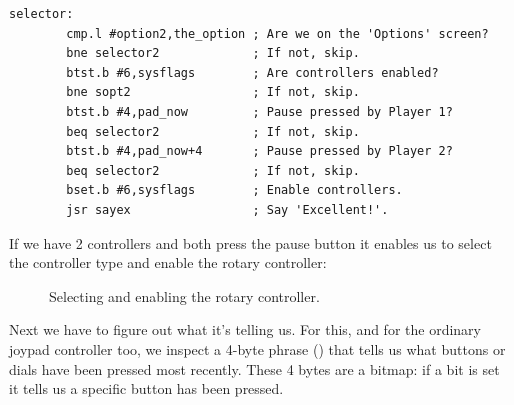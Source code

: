 \begin{lstlisting}
selector:
        cmp.l #option2,the_option ; Are we on the 'Options' screen?
        bne selector2             ; If not, skip.
        btst.b #6,sysflags        ; Are controllers enabled?
        bne sopt2                 ; If not, skip.
        btst.b #4,pad_now         ; Pause pressed by Player 1?
        beq selector2             ; If not, skip.
        btst.b #4,pad_now+4       ; Pause pressed by Player 2?
        beq selector2             ; If not, skip.
        bset.b #6,sysflags        ; Enable controllers.
        jsr sayex                 ; Say 'Excellent!'.
\end{lstlisting}
If we have 2 controllers and both press the pause button it enables us to select the controller
type and enable the rotary controller:
\begin{figure}[H]
    \centering
    \begin{adjustbox}{width=10cm,center}
      \hspace{0.5cm}
    \end{adjustbox}
  \caption*{Selecting and enabling the rotary controller.}
\end{figure}

Next we have to figure out what it's telling us. For this, and for the ordinary joypad controller too,
we inspect a 4-byte phrase () that tells us what buttons or dials have been pressed most recently.
These 4 bytes are a bitmap: if a bit is set it tells us a specific button has been pressed. 

